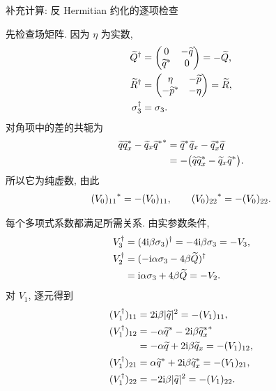 \par\medskip\noindent 补充计算: 反 Hermitian 约化的逐项检查\par
\par\smallskip\noindent 先检查场矩阵.\quad
因为 $\eta$ 为实数,
\begin{align*}
\widetilde Q^\dagger
&=\begin{pmatrix}0&-\widetilde q\\{\widetilde q}^{*}&0\end{pmatrix}
=-\widetilde Q,\\
\widetilde R^\dagger
&=\begin{pmatrix}\eta&-\widetilde p\\-{\widetilde p}^{*}&-\eta\end{pmatrix}
=\widetilde R,\\
\sigma_3^\dagger&=\sigma_3.
\end{align*}
对角项中的差的共轭为
\begin{align*}
{\widetilde q{\widetilde q_x}^{*}
-\widetilde q_x{\widetilde q}^{*}}^{*}
&={\widetilde q}^{*}\widetilde q_x
-{\widetilde q_x}^{*}\widetilde q\\
&=-\bigl(\widetilde q{\widetilde q_x}^{*}
-\widetilde q_x{\widetilde q}^{*}\bigr).
\end{align*}
所以它为纯虚数, 由此
\begin{equation*}
{(V_0)_{11}}^{*}=-(V_0)_{11},
\qquad
{(V_0)_{22}}^{*}=-(V_0)_{22}.
\end{equation*}
\par\smallskip\noindent 每个多项式系数都满足所需关系.\quad
由实参数条件,
\begin{align*}
V_3^\dagger
&=(4\mathrm{i}\beta\sigma_3)^\dagger
=-4\mathrm{i}\beta\sigma_3=-V_3,\\
V_2^\dagger
&=(-\mathrm{i}\alpha\sigma_3-4\beta\widetilde Q)^\dagger\\
&=\mathrm{i}\alpha\sigma_3+4\beta\widetilde Q=-V_2.
\end{align*}
对 $V_1$, 逐元得到
\begin{align*}
(V_1^\dagger)_{11}
&=2\mathrm{i}\beta|\widetilde q|^2=-(V_1)_{11},\\
(V_1^\dagger)_{12}
&={-\alpha{\widetilde q}^{*}-2\mathrm{i}\beta{\widetilde q_x}^{*}}^{*}\\
&=-\alpha\widetilde q+2\mathrm{i}\beta\widetilde q_x
=-(V_1)_{12},\\
(V_1^\dagger)_{21}
&=\alpha{\widetilde q}^{*}+2\mathrm{i}\beta{\widetilde q_x}^{*}
=-(V_1)_{21},\\
(V_1^\dagger)_{22}
&=-2\mathrm{i}\beta|\widetilde q|^2=-(V_1)_{22}.
\end{align*}

